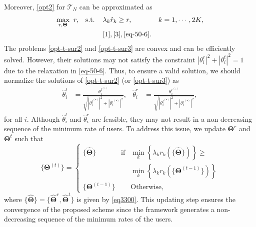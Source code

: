 \documentclass[a4, conference]{IEEEtran}
\theoremstyle{definition}
\begin{document}
Moreover, \eqref{opt2} for $\mathcal{T}_N$ can be approximated as %
\begin{subequations}\label{opt-t-sur3}
\begin{align}%
\underset{
r,\bm{\Theta}%
}
{\max} \hspace{0.2cm}&r,
&
\text{s.t.}\hspace{0.4cm}& \lambda_{k}\hat{r}_{k}\geq r, & k=1,\cdots,2K,
\\
&&& \eqref{1},\eqref{3},\eqref{eq-50-6}.
\end{align}
\end{subequations}
The problems \eqref{opt-t-sur2} and \eqref{opt-t-sur3} are convex and can be efficiently solved. However, their solutions may not satisfy the constraint $|\theta_{i}^{r}|^2+|\theta_{i}^{t}|^2= 1$ due to the relaxation in \eqref{eq-50-6}. 
Thus, to ensure a valid solution, we should normalize the solutions of \eqref{opt-t-sur2} (or \eqref{opt-t-sur3}) as 
\begin{align}\label{eq3300}
\hat{\theta}_{i}^t\!&\!=\!\frac
{{\theta}_{i}^{t^{(\star)}}}
{\sqrt{|{\theta}_{i}^{t^{(\star)}}|^2+|{\theta}_{i}^{r^{(\star)}}|^2}},&\!\!
\hat{\theta}_{i}^r\!&\!=\!\frac
{{\theta}_{i}^{r^{(\star)}}}
{\sqrt{|{\theta}_{i}^{t^{(\star)}}|^2+|{\theta}_{i}^{r^{(\star)}}|^2}},
\end{align}
for all $i$. 
Although $\hat{\theta}_{i}^t$ and $\hat{\theta}_{i}^r$ are feasible, they may not result in a non-decreasing sequence of the minimum rate of users. To address this issue, 
 we update $\bm{\Theta}^r$ and $\bm{\Theta}^t$ such that 
\begin{equation}\label{eq-42-star}
\{\!\bm{\Theta}^{(t)}\!\}\!=\!\!
\left\{\!\!\!\!\!
\begin{array}{lcl}
\{\hat{\bm{\Theta}}\}\!\!&\!\!\!\!\!\!\text{if}\!\!&
\min_{k}\left\{\lambda_{k}r_k\!\!\left(\{\hat{\bm{\Theta}}\}\!\right)\right\}\!\!\geq\!\!\!\!\!
\\
&&
\min_{k}\left\{\lambda_{k}r_k\!\!\left(\{\bm{\Theta}^{(t-1)}\}\!\right)\right\}
\\
\{\bm{\Theta}^{(t-1)}\}&&\text{Otherwise},
\end{array}
\right.
\end{equation}
where $\{\hat{\bm{\Theta}}\}=\{\hat{\bm{\Theta}}^{r},\hat{\bm{\Theta}}^{t}\}$ is given by \eqref{eq3300}. 
This updating step ensures the convergence of the proposed scheme since the framework generates a non-decreasing sequence of the minimum rates of the users.
\end{document}

